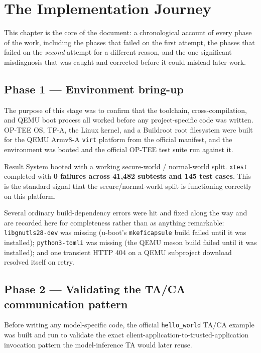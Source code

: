 \documentclass[11pt,a4paper]{report}
\newcommand{\code}[1]{\texttt{\small #1}}
\begin{document}
\chapter{The Implementation Journey}
\label{ch:crisis}

This chapter is the core of the document: a chronological account of every phase of the work,
including the phases that failed on the first attempt, the phases that failed on the \emph{second}
attempt for a different reason, and the one significant misdiagnosis that was caught and corrected
before it could mislead later work.

\section{Phase 1 --- Environment bring-up}

The purpose of this stage was to confirm that the toolchain, cross-compilation, and QEMU boot
process all worked before any project-specific code was written. OP-TEE OS, TF-A, the Linux kernel,
and a Buildroot root filesystem were built for the QEMU Armv8-A \code{virt} platform from the
official manifest, and the environment was booted and the official OP-TEE test suite run against
it.

\begin{resolvedbox}{Result}
System booted with a working secure-world / normal-world split. \code{xtest} completed with
\textbf{0 failures across 41{,}482 subtests and 145 test cases}. This is the standard signal that
the secure/normal-world split is functioning correctly on this platform.
\end{resolvedbox}

Several ordinary build-dependency errors were hit and fixed along the way and are recorded here for
completeness rather than as anything remarkable: \code{libgnutls28-dev} was missing (u-boot's
\code{mkeficapsule} build failed until it was installed); \code{python3-tomli} was missing (the
QEMU meson build failed until it was installed); and one transient HTTP 404 on a QEMU subproject
download resolved itself on retry.

\section{Phase 2 --- Validating the TA/CA communication pattern}
\label{sec:m2}

Before writing any model-specific code, the official \code{hello\_world} TA/CA example was built
and run to validate the exact client-application-to-trusted-application invocation pattern the
model-inference TA would later reuse.
\end{document}
